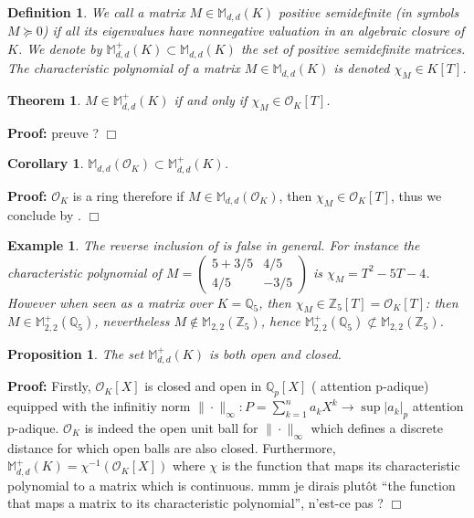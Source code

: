 \documentclass[a4paper,12pt]{article}
\newenvironment{proof}{\hbox{}\vspace{-0.8cm} {\bf Proof:}}{\hfill $\Box$}
\newtheorem{theorem}{Theorem}[section]
\newtheorem{proposition}{Proposition}
\newtheorem{corollary}{Corollary}
\newtheorem{definition}{Definition}
\newtheorem{example}{Example}
\newcommand{\allmat}{\mathbb{M}} %
\newcommand{\simone}[1]{{\color{blue} #1}} %
\newcommand{\OK}{\mathcal{O}_K}
\begin{document}
\begin{definition}
  We call a matrix $M \in \allmat_{d,d}(K)$ \emph{positive semidefinite} (in symbols $M \succeq 0$)
  if all its eigenvalues have nonnegative valuation in an algebraic closure of $K$.
  We denote by $\allmat_{d,d}^+(K) \subset \allmat_{d,d}(K)$ the set of positive semidefinite matrices.
  The characteristic polynomial of a matrix $M \in \allmat_{d,d}(K)$ is denoted $\chi_M \in K[T]$.
\end{definition}

\begin{theorem}
  \label{caracsdp}
  $M \in \allmat_{d,d}^+(K)$ if and only if $\chi_M \in \OK[T]$.
\end{theorem}
\begin{proof}
  \simone{preuve ?}
\end{proof}

\begin{corollary}\label{cor_caracsdp}
  $\allmat_{d,d}(\OK) \subset \allmat_{d,d}^+(K)$.
\end{corollary}
\begin{proof}
  $\OK$ is a ring therefore if $M \in \allmat_{d,d}(\OK)$, then $\chi_M \in \OK[T]$, thus we conclude
  by .
\end{proof}

\begin{example}
  The reverse inclusion of  is false in general. For instance the characteristic polynomial of
  $M = (\begin{smallmatrix} 5 + {3}/{5} & {4}/{5} \\ {4}/{5} & -{3}/{5} \end{smallmatrix})$ is $\chi_M = T^2-5T-4$. However when seen as a matrix over $K=\mathbb{Q}_5$, then $\chi_M \in \mathbb{Z}_5[T] = \OK[T]$: then $M \in \allmat_{2,2}^+(\mathbb{Q}_5)$, nevertheless $M \not\in \allmat_{2,2}(\mathbb{Z}_5)$, hence $\allmat_{2,2}^+(\mathbb{Q}_5) \not\subset \allmat_{2,2}(\mathbb{Z}_5)$.
\end{example}

\begin{proposition}
  The set $\allmat_{d,d}^+(K)$ is both open and closed.
\end{proposition}
\begin{proof}
Firstly, $\OK[X]$ is closed and open in $\mathbb{Q}_{p}[X]$ (\simone{attention p-adique}) equipped with the infinitiy norm $\|\cdot\|_\infty : P = \sum_{k=1}^{n} a_k X^k \to \sup |a_k|_p$ \simone{attention p-adique}. $\OK$ is indeed the open unit ball for $\|\cdot \|_\infty$ which defines a discrete distance for which open balls are also closed.
Furthermore, $\allmat^+_{d,d}(K) = \chi^{-1}(\OK[X]) $ where $\chi$ is the function that maps its characteristic polynomial to a matrix which is continuous. \simone{mmm je dirais plutôt ``the function that maps a matrix to its characteristic polynomial'', n'est-ce pas ?}
\end{proof}
\end{document}
